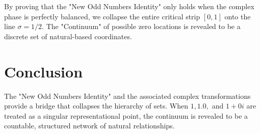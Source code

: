 \documentclass[12pt,a4paper]{article}
\begin{document}
By proving that the "New Odd Numbers Identity" only holds when the complex phase is perfectly balanced, we collapse the entire critical strip $[0, 1]$ onto the line $\sigma = 1/2$. The "Continuum" of possible zero locations is revealed to be a discrete set of natural-based coordinates.

\section{Conclusion}
The "New Odd Numbers Identity" and the associated complex transformations provide a bridge that collapses the hierarchy of sets. When $1, 1.0,$ and $1+0i$ are treated as a singular representational point, the continuum is revealed to be a countable, structured network of natural relationships.
\end{document}
